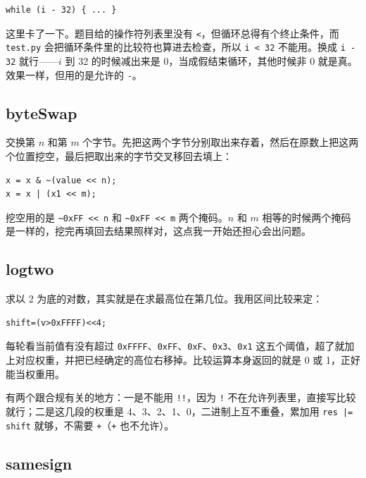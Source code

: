 \documentclass[11pt, a4paper]{ctexart}
\begin{document}
\begin{lstlisting}[style=c]
while (i - 32) { ... }
\end{lstlisting}

这里卡了一下。题目给的操作符列表里没有 \texttt{<}，但循环总得有个终止条件，而 \texttt{test.py} 会把循环条件里的比较符也算进去检查，所以 \texttt{i < 32} 不能用。换成 \texttt{i - 32} 就行——$i$ 到 32 的时候减出来是 0，当成假结束循环，其他时候非 0 就是真。效果一样，但用的是允许的 \texttt{-}。

\subsection{byteSwap}

交换第 $n$ 和第 $m$ 个字节。先把这两个字节分别取出来存着，然后在原数上把这两个位置挖空，最后把取出来的字节交叉移回去填上：

\begin{lstlisting}[style=c]
x = x & ~(value << n);
x = x | (x1 << m);
\end{lstlisting}

挖空用的是 \texttt{\textasciitilde 0xFF << n} 和 \texttt{\textasciitilde 0xFF << m} 两个掩码。$n$ 和 $m$ 相等的时候两个掩码是一样的，挖完再填回去结果照样对，这点我一开始还担心会出问题。

\subsection{logtwo}

求以 2 为底的对数，其实就是在求最高位在第几位。我用区间比较来定：

\begin{lstlisting}[style=c]
shift=(v>0xFFFF)<<4;
\end{lstlisting}

每轮看当前值有没有超过 \texttt{0xFFFF}、\texttt{0xFF}、\texttt{0xF}、\texttt{0x3}、\texttt{0x1} 这五个阈值，超了就加上对应权重，并把已经确定的高位右移掉。比较运算本身返回的就是 0 或 1，正好能当权重用。

有两个跟合规有关的地方：一是不能用 \texttt{!!}，因为 \texttt{!} 不在允许列表里，直接写比较就行；二是这几段的权重是 4、3、2、1、0，二进制上互不重叠，累加用 \texttt{res |= shift} 就够，不需要 \texttt{+}（\texttt{+} 也不允许）。

\subsection{samesign}
\end{document}
